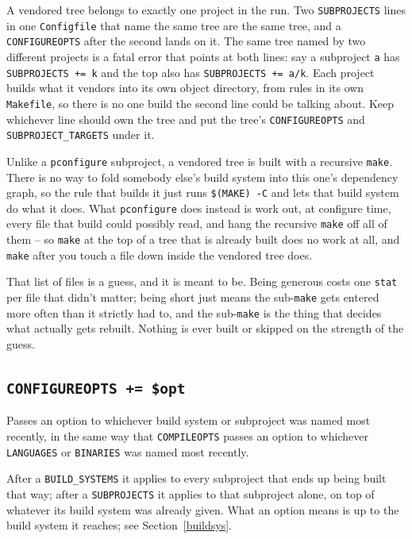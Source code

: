 \documentclass{article}
\begin{document}
A vendored tree belongs to exactly one project in the run.  Two
\texttt{SUBPROJECTS} lines in one \texttt{Configfile} that name the
same tree are the same tree, and a \texttt{CONFIGUREOPTS} after the
second lands on it.  The same tree named by two different projects is
a fatal error that points at both lines: say a subproject \texttt{a}
has \texttt{SUBPROJECTS += k} and the top also has
\texttt{SUBPROJECTS += a/k}.  Each project builds what it vendors into
its own object directory, from rules in its own \texttt{Makefile}, so
there is no one build the second line could be talking about.  Keep
whichever line should own the tree and put the tree's
\texttt{CONFIGUREOPTS} and \texttt{SUBPROJECT\_TARGETS} under it.

Unlike a \texttt{pconfigure} subproject, a vendored tree is built with
a recursive \texttt{make}.  There is no way to fold somebody else's
build system into this one's dependency graph, so the rule that
builds it just runs \texttt{\$(MAKE) -C} and lets that build system do
what it does.  What \texttt{pconfigure} does instead is work out, at
configure time, every file that build could possibly read, and hang
the recursive \texttt{make} off all of them -- so \texttt{make} at the
top of a tree that is already built does no work at all, and
\texttt{make} after you touch a file down inside the vendored tree
does.

That list of files is a guess, and it is meant to be.  Being generous
costs one \texttt{stat} per file that didn't matter; being short just
means the sub-\texttt{make} gets entered more often than it strictly
had to, and the sub-\texttt{make} is the thing that decides what
actually gets rebuilt.  Nothing is ever built or skipped on the
strength of the guess.

\subsection{\texttt{CONFIGUREOPTS += \$opt} \label{cmd:configureopts}}

Passes an option to whichever build system or subproject was named
most recently, in the same way that \texttt{COMPILEOPTS} passes an
option to whichever \texttt{LANGUAGES} or \texttt{BINARIES} was named
most recently.

After a \texttt{BUILD\_SYSTEMS} it applies to every subproject that
ends up being built that way; after a \texttt{SUBPROJECTS} it applies
to that subproject alone, on top of whatever its build system was
already given.  What an option means is up to the build system it
reaches; see Section~\ref{buildsys}.
\end{document}
